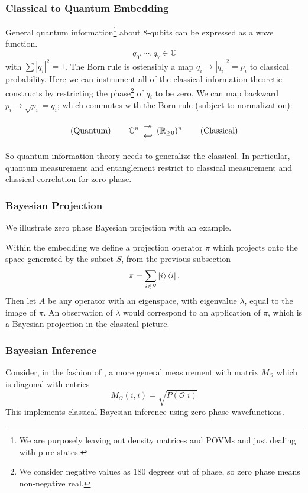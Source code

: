 \documentclass[12pt,a4paper]{article}
\begin{document}
\subsubsection{Classical to Quantum Embedding}
General quantum information\footnote{We are purposely leaving out density matrices and POVMs and just dealing with pure states.} about 8-qubits can be expressed as a wave function.
\[
   q_0,\cdots,q_{7} \in \mathbb{C}
\]
with $\sum |q_i|^2 = 1$.  The Born rule is ostensibly a map $q_i \rightarrow |q_i|^2 = p_i$ to classical probability.  Here we can instrument all of the classical information theoretic constructs by restricting the phase\footnote{We consider negative values as 180 degrees out of phase, so zero phase means non-negative real.} of $q_i$ to be zero.  We can map backward $p_i \rightarrow \sqrt{p_i} = q_i$; which commutes with the Born rule (subject to normalization):

{
\renewcommand{\arraystretch}{0.1}
\[
\text{(Quantum)} \hspace{0.3 in}
\mathbb{C}^n \begin{array}{c} \twoheadrightarrow \\ \hookleftarrow \end{array}
(\mathbb{R}_{\ge 0})^n
\hspace{0.3 in} \text{(Classical)} 
\]
}

So quantum information theory needs to generalize the classical.  In particular, quantum measurement and entanglement restrict to classical measurement and classical correlation for zero phase.

\subsubsection{Bayesian Projection}
We illustrate zero phase Bayesian projection with an example.

Within the embedding we define a projection operator $\pi$ which projects onto the space generated by the subset $S$, from the previous subsection
\[
\pi = \sum_{i \in S} \ket{i} \bra{i}.
\]
Then let $A$ be any operator with an eigenspace, with eigenvalue $\lambda$, equal to the image of $\pi$.  An observation of $\lambda$ would correspond to an application of $\pi$, which is a Bayesian projection in the classical picture.

\subsubsection{Bayesian Inference}
Consider, in the fashion of \cite{nielsenchuang}, a more general measurement with matrix $M_\mathcal{O}$ which is diagonal with entries
\[
   M_\mathcal{O}(i,i) = \sqrt{P(\mathcal{O} | i)}
\]
This implements classical Bayesian inference using zero phase wavefunctions.
\end{document}
